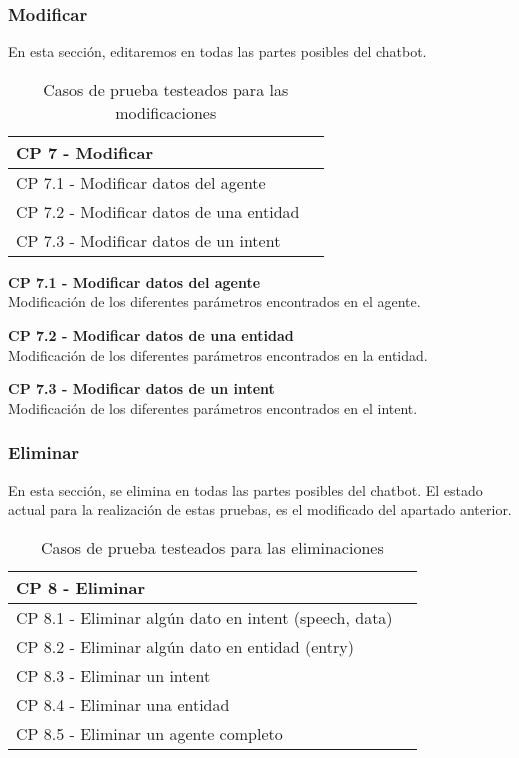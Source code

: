 \subsubsection{Modificar}
En esta sección, editaremos en todas las partes posibles del chatbot.

\begin{table}[H]
\centering
\begin{tabular}{ll}
\toprule
CP 7 - Modificar   \\
\midrule
CP 7.1 - Modificar datos del agente  \\
CP 7.2 - Modificar datos de una entidad \\
CP 7.3 - Modificar datos de un intent \\
\bottomrule
\end{tabular}
\caption{Casos de prueba testeados para las modificaciones}
\end{table}

\textbf{CP 7.1 - Modificar datos del agente} \\
Modificación de los diferentes parámetros encontrados en el agente.

\textbf{CP 7.2 - Modificar datos de una entidad} \\
Modificación de los diferentes parámetros encontrados en la entidad.

\textbf{CP 7.3 - Modificar datos de un intent} \\
Modificación de los diferentes parámetros encontrados en el intent.

\subsubsection{Eliminar}
En esta sección, se elimina en todas las partes posibles del chatbot. El estado actual para la realización de estas pruebas, es el modificado del apartado anterior.

\begin{table}[H]
\centering
\begin{tabular}{ll}
\toprule
CP 8 - Eliminar   \\
\midrule
CP 8.1 - Eliminar algún dato en intent (speech, data)  \\
CP 8.2 - Eliminar algún dato en entidad (entry) \\
CP 8.3 - Eliminar un intent \\
CP 8.4 - Eliminar una entidad \\
CP 8.5 - Eliminar un agente completo \\
\bottomrule
\end{tabular}
\caption{Casos de prueba testeados para las eliminaciones}
\end{table}

